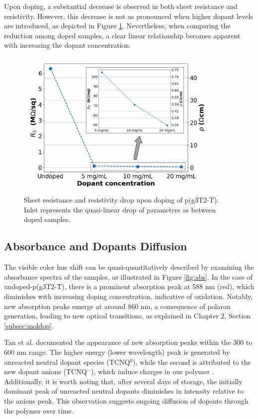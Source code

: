 Upon doping, a substantial decrease is observed in both sheet resistance and resistivity. However, this decrease is not as pronounced when higher dopant levels are introduced, as depicted in Figure \ref{fig:rho}. Nevertheless, when comparing the reduction among doped samples, a clear linear relationship becomes apparent with increasing the dopant concentration. 

\begin{figure}[ht]
  \centering
  \includegraphics[width=10cm]{Images/pdf/resist+inlet.pdf}
  \caption[Sheet resistance and resistivity drop upon doping]{Sheet resistance and resistivity drop upon doping of p(g3T2-T). Inlet represents the quasi-linear drop of parameters as between doped samples.}
  \label{fig:rho}
\end{figure}


\subsection{Absorbance and Dopants Diffusion}
The visible color hue shift can be quasi-quantitatively described by examining the absorbance spectra of the samples, as illustrated in Figure \ref{fig:abs}. In the case of undoped-p(g3T2-T), there is a prominent absorption peak at 588 nm (red), which diminishes with increasing doping concentration, indicative of oxidation. Notably, new absorption peaks emerge at around 860 nm, a consequence of polaron generation, leading to new optical transitions, as explained in Chapter 2, Section \ref{subsec:moldop}. 

Tan et al. documented the appearance of new absorption peaks within the 300 to 600 nm range. The higher energy (lower wavelength) peak is generated by unreacted neutral dopant species (TCNQ$^{0}$), while the second is attributed to the new dopant anions (TCNQ$^{-}$), which induce charges in our polymer \cite{tanTuningOrganicElectrochemical2022}. Additionally, it is worth noting that, after several days of storage, the initially dominant peak of unreacted neutral dopants diminishes in intensity relative to the anions peak. This observation suggests ongoing diffusion of dopants through the polymer over time. 


